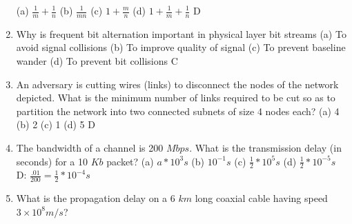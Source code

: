 \documentclass{article}
\begin{document}
\begin{enumerate}
            \newline
            (a) $\frac{1}{m} + \frac{1}{n}$
            \newline
            (b) $\frac{1}{mn}$
            \newline
            (c) $1 + \frac{m}{n}$
            \newline
            (d) $1 + \frac{1}{m} + \frac{1}{n}$
            \newline
            D
        \item Why is frequent bit alternation important in physical layer bit streams
            \newline
            (a) To avoid signal collisions
            \newline
            (b) To improve quality of signal
            \newline
            (c) To prevent baseline wander
            \newline
            (d) To prevent bit collisions
            \newline
            C
        \item An adversary is cutting wires (links) to disconnect the nodes of the network depicted. What is the minimum number of links required to be cut so as to partition the network into two connected subnets of size 4 nodes each?
            \newline
            (a) 4
            \newline
            (b) 2
            \newline
            (c) 1
            \newline
            (d) 5
            \newline
            D
        \item The bandwidth of a channel is 200 $Mbps$. What is the transmission delay (in seconds) for a 10 $Kb$ packet?
            \newline
            (a) $a * 10^3 s$
            \newline
            (b) $10^{-1} s$
            \newline
            (c) $\frac{1}{2} * 10^5 s$
            \newline
            (d) $\frac{1}{2} * 10^{-5} s$
            \newline
            D: $\frac{.01}{200} = \frac{1}{2} * 10^{-4} s$
        \item What is the propagation delay on a 6 $km$ long coaxial cable having speed $3 \times 10^8m/s$?
            \newline

\end{enumerate}
\end{document}
